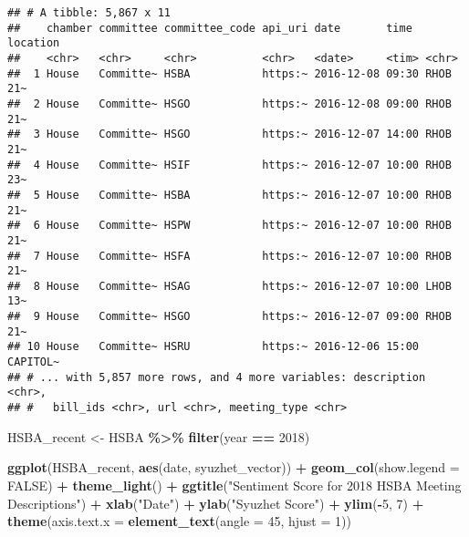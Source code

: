 \documentclass[]{article}
\newenvironment{Shaded}{\begin{snugshade}}{\end{snugshade}}
\newcommand{\DataTypeTok}[1]{\textcolor[rgb]{0.13,0.29,0.53}{#1}}
\newcommand{\DecValTok}[1]{\textcolor[rgb]{0.00,0.00,0.81}{#1}}
\newcommand{\KeywordTok}[1]{\textcolor[rgb]{0.13,0.29,0.53}{\textbf{#1}}}
\newcommand{\NormalTok}[1]{#1}
\newcommand{\OperatorTok}[1]{\textcolor[rgb]{0.81,0.36,0.00}{\textbf{#1}}}
\newcommand{\OtherTok}[1]{\textcolor[rgb]{0.56,0.35,0.01}{#1}}
\newcommand{\StringTok}[1]{\textcolor[rgb]{0.31,0.60,0.02}{#1}}
\begin{document}
\begin{verbatim}
## # A tibble: 5,867 x 11
##    chamber committee committee_code api_uri date       time  location
##    <chr>   <chr>     <chr>          <chr>   <date>     <tim> <chr>   
##  1 House   Committe~ HSBA           https:~ 2016-12-08 09:30 RHOB 21~
##  2 House   Committe~ HSGO           https:~ 2016-12-08 09:00 RHOB 21~
##  3 House   Committe~ HSGO           https:~ 2016-12-07 14:00 RHOB 21~
##  4 House   Committe~ HSIF           https:~ 2016-12-07 10:00 RHOB 23~
##  5 House   Committe~ HSBA           https:~ 2016-12-07 10:00 RHOB 21~
##  6 House   Committe~ HSPW           https:~ 2016-12-07 10:00 RHOB 21~
##  7 House   Committe~ HSFA           https:~ 2016-12-07 10:00 RHOB 21~
##  8 House   Committe~ HSAG           https:~ 2016-12-07 10:00 LHOB 13~
##  9 House   Committe~ HSGO           https:~ 2016-12-07 09:00 RHOB 21~
## 10 House   Committe~ HSRU           https:~ 2016-12-06 15:00 CAPITOL~
## # ... with 5,857 more rows, and 4 more variables: description <chr>,
## #   bill_ids <chr>, url <chr>, meeting_type <chr>
\end{verbatim}

\begin{Shaded}
\begin{Highlighting}[]
\NormalTok{HSBA\_recent \textless{}{-}}\StringTok{ }\NormalTok{HSBA }\OperatorTok{\%\textgreater{}\%}
\StringTok{  }\KeywordTok{filter}\NormalTok{(year }\OperatorTok{==}\StringTok{ }\DecValTok{2018}\NormalTok{)}

\KeywordTok{ggplot}\NormalTok{(HSBA\_recent, }\KeywordTok{aes}\NormalTok{(date, syuzhet\_vector)) }\OperatorTok{+}
\StringTok{  }\KeywordTok{geom\_col}\NormalTok{(}\DataTypeTok{show.legend =} \OtherTok{FALSE}\NormalTok{) }\OperatorTok{+}
\StringTok{  }\KeywordTok{theme\_light}\NormalTok{() }\OperatorTok{+}\StringTok{ }
\StringTok{  }\KeywordTok{ggtitle}\NormalTok{(}\StringTok{"Sentiment Score for 2018 HSBA Meeting Descriptions"}\NormalTok{) }\OperatorTok{+}\StringTok{  }
\StringTok{  }\KeywordTok{xlab}\NormalTok{(}\StringTok{"Date"}\NormalTok{) }\OperatorTok{+}\StringTok{ }
\StringTok{  }\KeywordTok{ylab}\NormalTok{(}\StringTok{"Syuzhet Score"}\NormalTok{) }\OperatorTok{+}\StringTok{  }
\StringTok{  }\KeywordTok{ylim}\NormalTok{(}\OperatorTok{{-}}\DecValTok{5}\NormalTok{, }\DecValTok{7}\NormalTok{) }\OperatorTok{+}
\StringTok{  }\KeywordTok{theme}\NormalTok{(}\DataTypeTok{axis.text.x =} \KeywordTok{element\_text}\NormalTok{(}\DataTypeTok{angle =} \DecValTok{45}\NormalTok{, }\DataTypeTok{hjust =} \DecValTok{1}\NormalTok{)) }
\end{Highlighting}
\end{Shaded}
\end{document}
